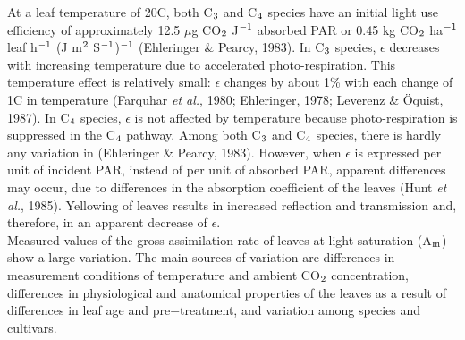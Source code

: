 \documentclass[11pt]{article}
\begin{document}
At a leaf temperature of 20\degrees C, both C$_{{\rm 3}}$ and C$_{{\rm 4}}$ species have an initial light use efficiency
of approximately 12.5 $\mu$g CO$_{{\rm 2}}$ J$^{{\rm -1}}$ absorbed PAR or 0.45 kg CO$_{{\rm 2}}$ ha$^{{\rm -}{1}}$ leaf h$^{{\rm -}{1}}$ (J m$^{{\rm 2}}$ S$^{{\rm -}{1}}$)$^{{\rm -}{1}}$
(Ehleringer \& Pearcy, 1983). In C$_{{\rm 3}}$ species, $\epsilon$ decreases with increasing temperature due
to accelerated photo-respiration. This temperature effect is relatively small: $\epsilon$ changes by
about 1\% with each change of 1\degrees C in temperature (Farquhar {\it et al.\/}, 1980; Ehleringer,
1978; Leverenz \& \"{O}quist, 1987). In C$_{{\rm 4}}$ species, $\epsilon$ is not affected by temperature because
photo-respiration is suppressed in the C$_{{\rm 4}}$ pathway. Among both C$_{{\rm 3}}$ and C$_{{\rm 4}}$ species, there
is hardly any variation in (Ehleringer \& Pearcy, 1983). However, when $\epsilon$ is expressed per
unit of incident PAR, instead of per unit of absorbed PAR, apparent differences may
occur, due to differences in the absorption coefficient of the leaves (Hunt {\it et al.\/}, 1985).
Yellowing of leaves results in increased reflection and transmission and, therefore, in an
apparent decrease of $\epsilon$.  \\
Measured values of the gross assimilation rate of leaves at light saturation (A$_{{\rm m}}$) show a
large variation. The main sources of variation are differences in measurement conditions
of temperature and ambient CO$_{{\rm 2}}$ concentration, differences in physiologi\-cal and anatomi\-cal proper\-ties of the leaves as a result of differences in leaf age and pre$-$treatment, and
variation among species and cultivars.
\end{document}
